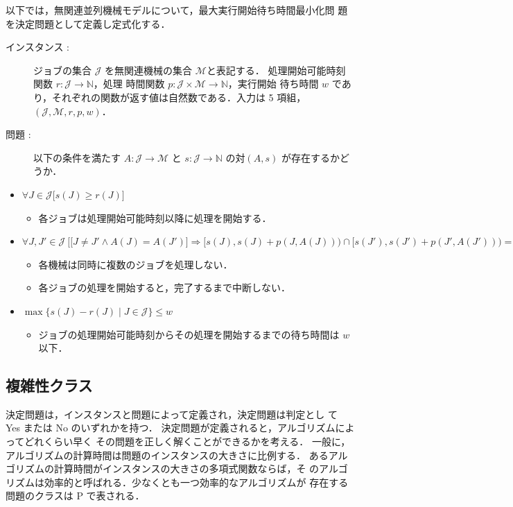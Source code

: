 \documentclass[12pt]{optlab-bachelor}
\begin{document}
以下では，無関連並列機械モデルについて，最大実行開始待ち時間最小化問
題を決定問題として定義し定式化する．

\begin{description}

  \item[インスタンス : ] ジョブの集合 $\mathcal{J}$ を無関連機械の集合 $\mathcal{M}$と表記する．
  処理開始可能時刻関数 $r : \mathcal{J} \to \mathbb{N}$，処理
  時間関数 $p : \mathcal{J} \times \mathcal{M} \to \mathbb{N}$，実行開始
  待ち時間 $w$ であり，それぞれの関数が返す値は自然数である．入力は 5 項組，$(\mathcal{J}, \mathcal{M}, r, p, w)$．

  \item[問題 : ] 以下の条件を満たす $A : \mathcal{J} \to \mathcal{M}$ と $s : \mathcal{J} \to \mathbb{N}$ の対$(A,s)$ が存在するかどうか．
\end{description}

\begin{itemize}
  \item $\forall J \in \mathcal{J}\big[s(J) \ge r(J) \big]$
  \begin{itemize}
    \item 各ジョブは処理開始可能時刻以降に処理を開始する．
  \end{itemize}
  \item {\footnotesize $\forall J, J' \in \mathcal{J}\ \Big[ \big[J\ne J' \land A(J) = A(J')\big] \Rightarrow [s(J), s(J)+p(J,A(J))) \cap[s(J'), s(J')+p(J', A(J'))) = \emptyset \Big]$}
  \begin{itemize}
    \item 各機械は同時に複数のジョブを処理しない．
    \item 各ジョブの処理を開始すると，完了するまで中断しない．
  \end{itemize}
  \item $\max\big\{s(J) - r(J) \mid J \in \mathcal{J}\big\} \le w$
  \begin{itemize}
    \item ジョブの処理開始可能時刻からその処理を開始するまでの待ち時間は $w$ 以下．
  \end{itemize}
\end{itemize}

\subsection{複雑性クラス}
決定問題は，インスタンスと問題によって定義され，決定問題は判定とし
て Yes または No のいずれかを持つ．
決定問題が定義されると，アルゴリズムによってどれくらい早く
その問題を正しく解くことができるかを考える．
一般に，アルゴリズムの計算時間は問題のインスタンスの大きさに比例する．
あるアルゴリズムの計算時間がインスタンスの大きさの多項式関数ならば，そ
のアルゴリズムは効率的と呼ばれる．少なくとも一つ効率的なアルゴリズムが
存在する問題のクラスは P で表される．
\end{document}
